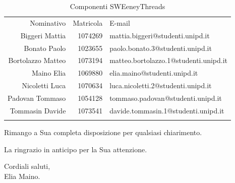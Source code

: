 \documentclass[a4paper]{article}
\begin{document}
	\begin{table}[H]
			\begin{tabularx}{\textwidth}{r r k}
				Nominativo & Matricola & E-mail \\
				Biggeri Mattia & 1074269 & mattia.biggeri@studenti.unipd.it \\
				Bonato Paolo & 1023655 & paolo.bonato.3@studenti.unipd.it\\
				Bortolazzo Matteo & 1073194 & matteo.bortolazzo.1@studenti.unipd.it \\
				Maino Elia & 1069880 & elia.maino@studenti.unipd.it \\
				Nicoletti Luca & 1070634 & luca.nicoletti.2@studenti.unipd.it \\
				Padovan Tommaso & 1054128 & tommaso.padovan@studenti.unipd.it \\
				Tommasin Davide & 1073541 & davide.tommasin.1@studenti.unipd.it \\
			\end{tabularx}
			\caption{Componenti SWEeneyThreads } 
			\label{ComponentiGruppo}
	\end{table}
	\begin{flushleft}
		Rimango a Sua completa disposizione per qualsiasi chiarimento.
	\end{flushleft}
	\begin{flushleft}
		La ringrazio in anticipo per la Sua attenzione.
	\end{flushleft}
	\begin{center}
		Cordiali saluti,\\
		\vspace{0,3cm}Elia Maino.
	\end{center}
	
\end{document}
